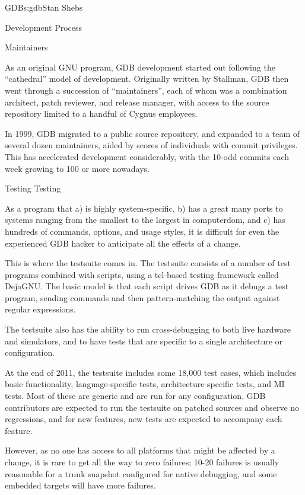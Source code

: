 \begin{aosachapter}{GDB}{s:gdb}{Stan Shebs}
\begin{aosasect1}{Development Process}
\begin{aosasect2}{Maintainers}

As an original GNU program, GDB development started out following the
``cathedral'' model of development.  Originally written by Stallman,
GDB then went through a succession of ``maintainers'', each of whom
was a combination architect, patch reviewer, and release manager, with
access to the source repository limited to a handful of Cygnus
employees.

In 1999, GDB migrated to a public source repository, and expanded to a
team of several dozen maintainers, aided by scores of individuals with
commit privileges.  This has accelerated development considerably,
with the 10-odd commits each week growing to 100 or more nowadays.

\end{aosasect2}

\begin{aosasect2}{Testing Testing}

As a program that a) is highly system-specific, b) has a great many
ports to systems ranging from the smallest to the largest in
computerdom, and c) has hundreds of commands, options, and usage
styles, it is difficult for even the experienced GDB hacker to
anticipate all the effects of a change.

This is where the testsuite comes in.  The testsuite consists of a
number of test programs combined with  scripts, using a
tcl-based testing framework called DejaGNU.  The basic model is that
each script drives GDB as it debugs a test program, sending commands and
then pattern-matching the output against regular expressions.

The testsuite also has the ability to run cross-debugging to both live
hardware and simulators, and to have tests that are specific to a
single architecture or configuration.

At the end of 2011, the testsuite includes some 18,000 test cases,
which includes basic functionality, language-specific tests,
architecture-specific tests, and MI tests.  Most of these are generic
and are run for any configuration.  GDB contributors are expected to
run the testsuite on patched sources and observe no regressions, and
for new features, new tests are expected to accompany each feature.

However, as no one has access to all platforms that might be affected
by a change, it is rare to get all the way to zero failures; 10-20
failures is usually reasonable for a trunk snapshot configured for
native debugging, and some embedded targets will have more failures.


\end{aosasect2}
\end{aosasect1}
\end{aosachapter}
